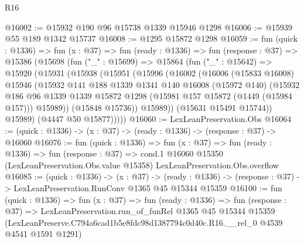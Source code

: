 \begin{lexlean}{R16}
\begin{coremodule}
@16002 := @15932 @190 @96 @15738 @1339 @15946 @1298
@16006 := @15939 @55 @189 @1342 @15737
@16008 := @1295 @15872 @1298
@16059 := fun (quick : @1336) =>
  fun (x : @37) =>
  fun (ready : @1336) =>
  fun (response : @37) =>
  @15386
    (@15698
      (fun ("_" : @15699) =>
      @15864
        (fun ("_" : @15642) =>
        @15920
          (@15931
            (@15938
              (@15951
                (@15996
                  (@16002
                    (@16006
                      (@15833 @16008)
                      @15946
                      (@15932
                        @141
                        @188
                        @1339
                        @1341
                        @140
                        @16008
                        (@15972 @140)
                        (@15932
                          @186
                          @96
                          @1339
                          @1339
                          @15872
                          @1298
                          (@15981 @157 @15872 (@1449 (@15984 @157)))
                          @15989))
                      (@15848 @15736))
                    @15989))
                (@15631 @15491 @15744))
              @15989)
            (@4447 @50 @15877)))))
@16060 := LexLeanPreservation.Obs
@16064 := (quick : @1336) -> (x : @37) -> (ready : @1336) -> (response : @37) -> @16060
@16076 := fun (quick : @1336) =>
  fun (x : @37) =>
  fun (ready : @1336) =>
  fun (response : @37) =>
  cond.{1} @16060 @15350 (LexLeanPreservation.Obs.value @15358) LexLeanPreservation.Obs.overflow
@16085 := (quick : @1336) ->
  (x : @37) ->
  (ready : @1336) -> (response : @37) -> LexLeanPreservation.RunConv @1365 @45 @15344 @15359
@16100 := fun (quick : @1336) =>
  fun (x : @37) =>
  fun (ready : @1336) =>
  fun (response : @37) =>
  LexLeanPreservation.run_of_funRel
    @1365
    @45
    @15344
    @15359
    (LexLeanPreserve.C794a6cad1b5e8fdc98d1387794c0d40c.R16.__rel_0 @4539 @4541 @1591 @1291)
\end{coremodule}
\end{lexlean}
